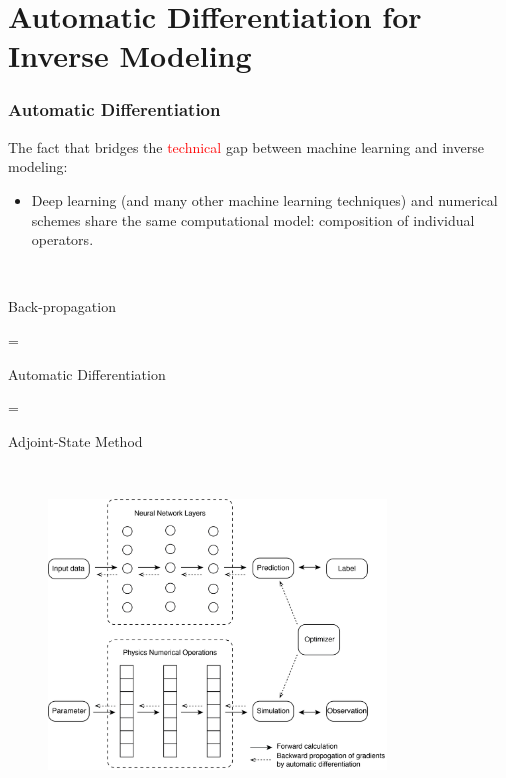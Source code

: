 \documentclass{beamer}
\begin{document}
\section{Automatic Differentiation for Inverse Modeling}

\begin{frame}
	\frametitle{Automatic Differentiation}
The fact that bridges the \textcolor{red}{technical} gap between machine learning and inverse modeling:
	\begin{itemize}
		\item Deep learning (and many other machine learning techniques) and numerical schemes share the same computational model: composition of individual operators. 
	\end{itemize}
	

\begin{minipage}[t]{0.4\textwidth}

\



\begin{center}
	Back-propagation 

= 

 Automatic Differentiation 

=
 
 Adjoint-State Method
\end{center}
\end{minipage}~
\begin{minipage}[t]{0.6\textwidth}
\begin{figure}[hbt]
  \includegraphics[width=0.8\textwidth]{../compare-NN-PDE.png}
\end{figure}
\end{minipage}

\end{frame}
\end{document}

